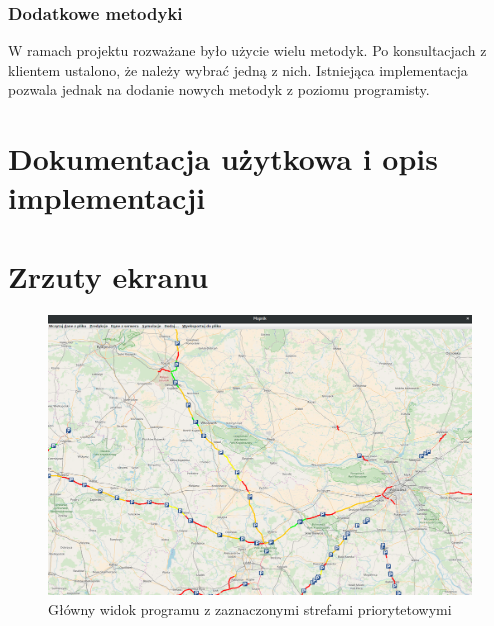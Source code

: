 \subsubsection{Dodatkowe metodyki} 
W ramach projektu rozważane było użycie wielu metodyk. Po konsultacjach z
klientem ustalono, że należy wybrać jedną z nich. Istniejąca implementacja
pozwala jednak na dodanie nowych metodyk z poziomu
programisty.

\section{Dokumentacja użytkowa i opis implementacji}

\section{Zrzuty ekranu}
\begin{figure}
  \centering
  \includegraphics[width=\textwidth]{images/mopnik/widok_glowny.png}
  \caption{Główny widok programu z zaznaczonymi strefami priorytetowymi}
\end{figure}
